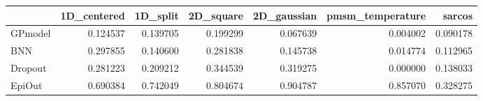 \begin{tabular}{lrrrrrr}
\toprule
{} &  1D\_centered &  1D\_split &  2D\_square &  2D\_gaussian &  pmsm\_temperature &    sarcos \\
\midrule
GPmodel &     0.124537 &  0.139705 &   0.199299 &     0.067639 &          0.004002 &  0.090178 \\
BNN     &     0.297855 &  0.140600 &   0.281838 &     0.145738 &          0.014774 &  0.112965 \\
Dropout &     0.281223 &  0.209212 &   0.344539 &     0.319275 &          0.000000 &  0.138033 \\
EpiOut  &     0.690384 &  0.742049 &   0.804674 &     0.904787 &          0.857070 &  0.328275 \\
\bottomrule
\end{tabular}

